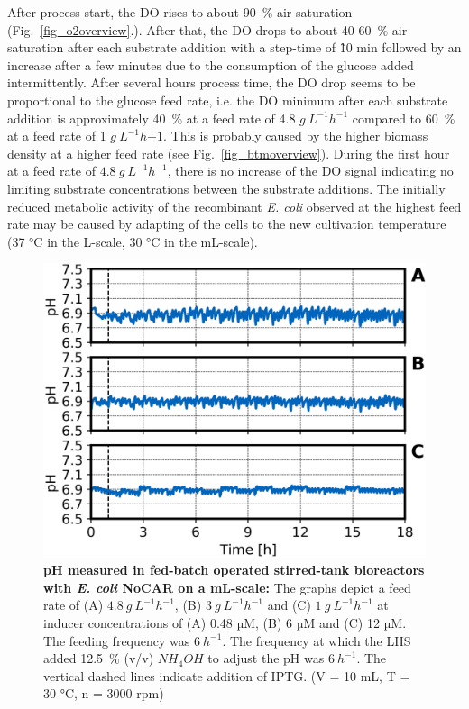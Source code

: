 \documentclass[sn-standardnature]{sn-jnl}%
\theoremstyle{thmstyleone}%
\theoremstyle{thmstyletwo}%
\theoremstyle{thmstylethree}%
\begin{document}
After process start, the DO rises to about 90~\% air saturation (Fig.~\ref{fig_o2overview}.).
After that, the DO drops to about 40-60~\% air saturation after each substrate addition with a step-time of \~10 min followed by an increase after a few minutes due to the consumption of the glucose added intermittently.
After several hours process time, the DO drop seems to be proportional to the glucose feed rate, i.e. the DO minimum after each substrate addition is approximately 40~\% at a feed rate of 4.8 $ g\ L^{-1} h^{-1}$ compared to 60~\% at a feed rate of 1 $ g\ L^{-1} h{-1}$.
This is probably caused by the higher biomass density at a higher feed rate (see Fig.~\ref{fig_btmoverview}).
During the first hour at a feed rate of $4.8\ g\ L^{-1} h^{-1}$, there is no increase of the DO signal indicating no limiting substrate concentrations between the substrate additions.
The initially reduced metabolic activity of the recombinant \textit{E. coli} observed at the highest feed rate may be caused by adapting of the cells to the new cultivation temperature (37 °C in the L-scale, 30 °C in the mL-scale).

\begin{figure}[H]
    \centering
    \includegraphics[width=1.0\textwidth]{figures/pH_overview.png}
    \caption{
        \textbf{pH measured in fed-batch operated stirred-tank bioreactors with \textit{E. coli} NoCAR on a mL-scale:}
        The graphs depict a feed rate of (A) $4.8\ g\ L^{-1} h^{-1}$, (B) $3\ g\ L^{-1} h^{-1}$ and (C) $1\ g\ L^{-1} h^{-1}$ at inducer concentrations of (A) 0.48 µM, (B) 6 µM and (C) 12 µM.
        The feeding frequency was $6\ h^{-1}$.
        The frequency at which the LHS added 12.5~\% (v/v) $NH_{4}OH$ to adjust the pH was $6\ h^{-1}$.
        The vertical dashed lines indicate addition of IPTG.
        (V = 10 mL, T = 30 °C, n = 3000 rpm)
    }
    \label{fig_pHoverview}
\end{figure}
\end{document}
